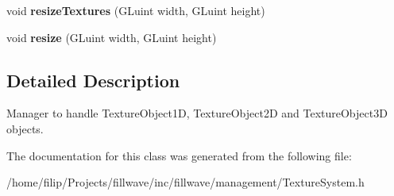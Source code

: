 \begin{DoxyCompactItemize}
\item 
void {\bfseries resize\+Textures} (G\+Luint width, G\+Luint height)\hypertarget{classflw_1_1flf_1_1TextureSystem_a2a238d17b12e782d64f177a8bfde7cd5}{}\label{classflw_1_1flf_1_1TextureSystem_a2a238d17b12e782d64f177a8bfde7cd5}

\item 
void {\bfseries resize} (G\+Luint width, G\+Luint height)\hypertarget{classflw_1_1flf_1_1TextureSystem_a7c134d68d2bfc21f16b3ad1316404713}{}\label{classflw_1_1flf_1_1TextureSystem_a7c134d68d2bfc21f16b3ad1316404713}

\end{DoxyCompactItemize}


\subsection{Detailed Description}
Manager to handle Texture\+Object1D, Texture\+Object2D and Texture\+Object3D objects. 

The documentation for this class was generated from the following file\+:\begin{DoxyCompactItemize}
\item 
/home/filip/\+Projects/fillwave/inc/fillwave/management/Texture\+System.\+h\end{DoxyCompactItemize}
